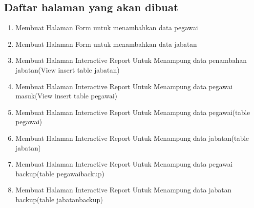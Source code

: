 \documentclass[12pt, times new roman, a4paper]{report}
\begin{document}
\subsection{ Daftar halaman yang akan dibuat }
\begin{enumerate}
\item Membuat Halaman Form untuk menambahkan data pegawai
\item Membuat Halaman Form untuk menambahkan data jabatan
\item Membuat Halaman Interactive Report Untuk Menampung data penambahan jabatan(View insert table jabatan)
\item Membuat Halaman Interactive Report Untuk Menampung data pegawai masuk(View insert table pegawai)
\item Membuat Halaman Interactive Report Untuk Menampung data pegawai(table pegawai)
\item Membuat Halaman Interactive Report Untuk Menampung data jabatan(table jabatan)
\item Membuat Halaman Interactive Report Untuk Menampung data pegawai backup(table pegawai\textunderscore backup)
\item Membuat Halaman Interactive Report Untuk Menampung data jabatan backup(table jabatan\textunderscore backup)
\end{enumerate}
\end{document}
